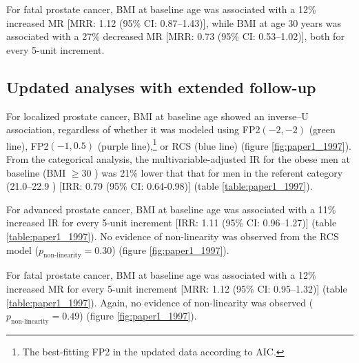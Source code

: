 For fatal prostate cancer, BMI at baseline age was associated with a 12\% increased MR [MRR: 1.12 (95\% CI: 0.87--1.43)], while BMI at age 30 years was associated with a 27\% decreased MR [MRR: 0.73 (95\% CI: 0.53--1.02)], both for every 5-unit increment.

\subsection{Updated analyses with extended follow-up}
\label{section:updated_paper1}

For localized prostate cancer, BMI at baseline age showed an inverse--U association, regardless of whether it was modeled using FP2$(-2, -2)$ (green line),  FP2$(-1, 0.5)$ (purple line),\footnote{The best-fitting FP2 in the updated data according to AIC.} or RCS (blue line) (figure \ref{fig:paper1_1997}). From the categorical analysis, the multivariable-adjusted IR for the obese men at baseline  (BMI $\ge30$ \kgmsq{}) was 21\% lower that that for men in the referent category (21.0--22.9 \kgmsq{}) [IRR: 0.79 (95\% CI: 0.64-0.98)] (table \ref{table:paper1_1997}). %

For advanced prostate cancer, BMI at baseline age was associated with a 11\% increased IR for every 5-unit increment [IRR: 1.11 (95\% CI: 0.96--1.27)] (table \ref{table:paper1_1997}). No evidence of non-linearity was observed from the RCS model ($p_{\textrm{non-linearity}}=0.30$) (figure \ref{fig:paper1_1997}). %

For fatal prostate cancer, BMI at baseline age was associated with a 12\% increased MR for every 5-unit increment [MRR: 1.12 (95\% CI: 0.95--1.32)] (table \ref{table:paper1_1997}). Again, no evidence of non-linearity was observed ($p_{\textrm{non-linearity}}=0.49$) (figure \ref{fig:paper1_1997}). %

